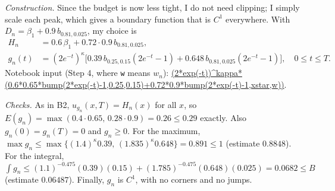 \documentclass[10pt,a4paper]{article}
\begin{document}
\emph{Construction.} Since the budget is now less tight, I do not need clipping; I simply scale each peak, which gives a boundary function that is $C^1$ everywhere. With $D_n=\beta_1+0.9\,b_{0.81,0.025}$, my choice is
\begin{equation}
\begin{aligned}H_n&=0.6\,\beta_1+0.72\cdot0.9\,b_{0.81,0.025},\\ g_n(t)&=(2e^{-t})^{\kappa}\bigl[0.39\,b_{0.25,0.15}(2e^{-t}-1)+0.648\,b_{0.81,0.025}(2e^{-t}-1)\bigr],\quad0\le t\le T.\end{aligned}
\end{equation}
Notebook input (Step 4, where \texttt{w} means $w_n$): {\small\url{(2*exp(-t))^kappa*(0.6*0.65*bump(2*exp(-t)-1,0.25,0.15)+0.72*0.9*bump(2*exp(-t)-1,xstar,w))}}.

\emph{Checks.} As in B2, $u_{g_n}(x,T)=H_n(x)$ for all $x$, so $E(g_n)=\max(0.4\cdot0.65,\,0.28\cdot0.9)=0.26\le0.29$ exactly. Also $g_n(0)=g_n(T)=0$ and $g_n\ge0$. For the maximum, $\max g_n\le\max\{(1.4)^{\kappa}0.39,\,(1.835)^{\kappa}0.648\}=0.891\le1$ (estimate $0.8848$). For the integral, $\int g_n\le(1.1)^{-0.475}(0.39)(0.15)+(1.785)^{-0.475}(0.648)(0.025)=0.0682\le B$ (estimate $0.06487$). Finally, $g_n$ is $C^1$, with no corners and no jumps.
\end{document}

